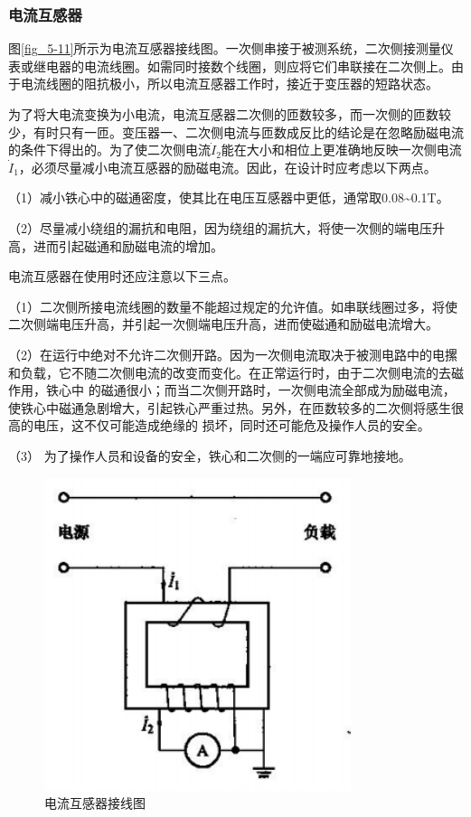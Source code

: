 \documentclass{book}
\begin{document}
\subsubsection{电流互感器}

图\ref{fig_5-11}所示为电流互感器接线图。一次侧串接于被测系统，二次侧接测量仪表或继电器的电流线圈。如需同时接数个线圈，则应将它们串联接在二次侧上。由于电流线圈的阻抗极小，所以电流互感器工作时，接近于变压器的短路状态。

为了将大电流变换为小电流，电流互感器二次侧的匝数较多，而一次侧的匝数较少，有时只有一匝。变压器一、二次侧电流与匝数成反比的结论是在忽略励磁电流的条件下得出的。为了使二次侧电流${{\dot{I}}_{2}}$能在大小和相位上更准确地反映一次侧电流${{\dot{I}}_{1}}$，必须尽量减小电流互感器的励磁电流。因此，在设计时应考虑以下两点。

（1）减小铁心中的磁通密度，使其比在电压互感器中更低，通常取0.08\textasciitilde0.1T。

（2）尽量减小绕组的漏抗和电阻，因为绕组的漏抗大，将使一次侧的端电压升高，进而引起磁通和励磁电流的增加。

电流互感器在使用时还应注意以下三点。

（1）二次侧所接电流线圈的数量不能超过规定的允许值。如串联线圈过多，将使二次侧端电压升高，并引起一次侧端电压升高，进而使磁通和励磁电流增大。

（2）在运行中绝对不允许二次侧开路。因为一次侧电流取决于被测电路中的电摞和负载，它不随二次侧电流的改变而变化。在正常运行时，由于二次侧电流的去磁作用，铁心中 的磁通很小；而当二次侧开路时，一次侧电流全部成为励磁电流，使铁心中磁通急剧增大，引起铁心严重过热。另外，在匝数较多的二次侧将感生很高的电压，这不仅可能造成绝缘的 损坏，同时还可能危及操作人员的安全。

（3） 为了操作人员和设备的安全，铁心和二次侧的一端应可靠地接地。

\begin{figure}[H]
	\centering
	\includegraphics[width=0.80\textwidth]{5-12.png}
	\caption{电流互感器接线图}
	\label{fig_5-12}
\end{figure}
\end{document}
